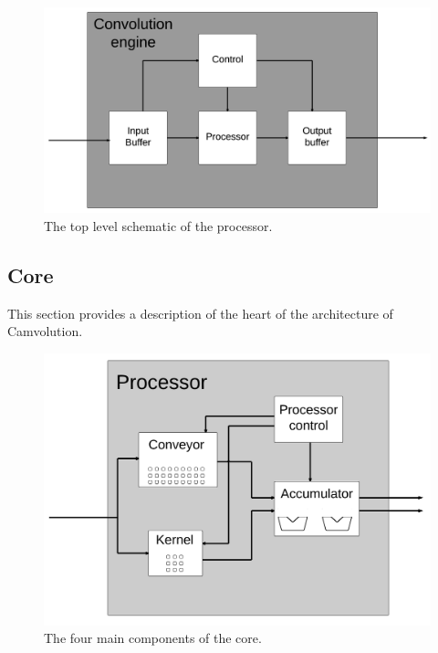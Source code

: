 \begin{figure}[h!]
    \includegraphics[width=\linewidth]{img/convolution_engine.png}
    \caption{The top level schematic of the processor.}
    \label{fig:conv_engine}
\end{figure}

\subsection{Core}
This section provides a description of the heart of the architecture of Camvolution.

\begin{figure}[h!]
    \includegraphics[width=\linewidth]{img/processor_small.png}
    \caption{The four main components of the core.}
    \label{fig:convolution_processor}
\end{figure}

